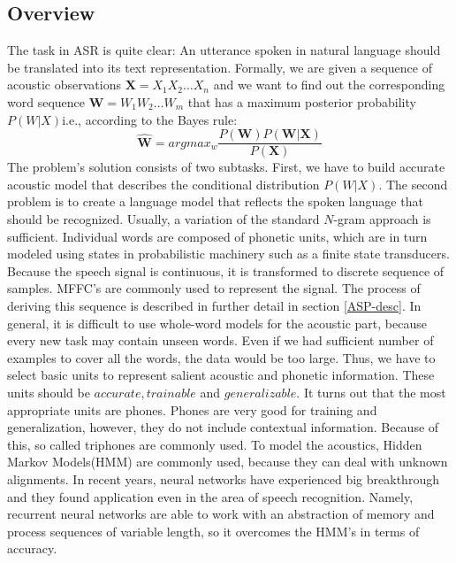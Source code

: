 \subsection*{Overview}
The task in ASR is quite clear: An utterance spoken in natural language should be translated into its text representation.
Formally, we are given a sequence of acoustic observations $\textbf{X} = X_1X_2\dots X_n$ and we want to find out the corresponding word sequence $\textbf{W} = W_1W_2\dots W_m$ that has a maximum posterior probability $P(W | X)$i.e., according to the Bayes rule:
\begin{equation}
\hat{\textbf{W}} = argmax_w \frac{P(\textbf{W})P(\textbf{W}|\textbf{X})}{P(\textbf{X})}
\end{equation}
The problem's solution consists of two subtasks.
First, we have to build accurate acoustic model that describes the conditional distribution $P(W|X)$.
The second problem is to create a language model that reflects the spoken language that should be recognized.
Usually, a variation of the standard $N$-gram approach is sufficient.
\linebreak\linebreak
Individual words are composed of phonetic units, which are in turn modeled using states in probabilistic machinery such as a finite state transducers.
Because the speech signal is continuous, it is transformed to discrete sequence of samples.
MFFC's are commonly used to represent the signal.
The process of deriving this sequence is described in further detail in section \ref{ASP-desc}.
In general, it is difficult to use whole-word models for the acoustic part, because every new task may contain unseen words.
Even if we had sufficient number of examples to cover all the words, the data would be too large.
Thus, we have to select basic units to represent salient acoustic and phonetic information.
These units should be $accurate, trainable$ and $generalizable$.
It turns out that the most appropriate units are phones.
Phones are very good for training and generalization, however, they do not include contextual information.
Because of this, so called triphones are commonly used.
\linebreak\linebreak
To model the acoustics, Hidden Markov Models(HMM) are commonly used, because they can deal with unknown alignments.
In recent years, neural networks have experienced big breakthrough and they found application even in the area of speech recognition.
Namely, recurrent neural networks are able to work with an abstraction of memory and process sequences of variable length, so it overcomes the HMM's in terms of accuracy.

